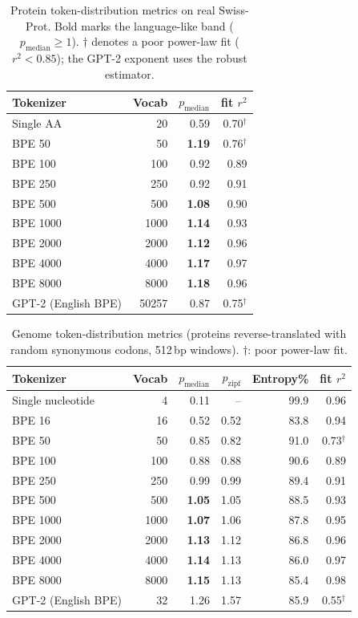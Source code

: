 \documentclass[11pt]{article}
\begin{document}
\begin{table}[t]
\centering
\caption{Protein token-distribution metrics on real Swiss-Prot. Bold marks the
language-like band ($p_{\text{median}}\!\geq\!1$). $\dagger$ denotes a poor
power-law fit ($r^2<0.85$); the GPT-2 exponent uses the robust estimator.}
\label{tab:protein}
\begin{tabular}{lrrr}
\toprule
Tokenizer & Vocab & $p_{\text{median}}$ & fit $r^2$ \\
\midrule
Single AA            & 20    & 0.59 & 0.70$^\dagger$ \\
BPE 50               & 50    & \textbf{1.19} & 0.76$^\dagger$ \\
BPE 100              & 100   & 0.92 & 0.89 \\
BPE 250              & 250   & 0.92 & 0.91 \\
BPE 500              & 500   & \textbf{1.08} & 0.90 \\
BPE 1000             & 1000  & \textbf{1.14} & 0.93 \\
BPE 2000             & 2000  & \textbf{1.12} & 0.96 \\
BPE 4000             & 4000  & \textbf{1.17} & 0.97 \\
BPE 8000             & 8000  & \textbf{1.18} & 0.96 \\
GPT-2 (English BPE)  & 50257 & 0.87 & 0.75$^\dagger$ \\
\bottomrule
\end{tabular}
\end{table}

\begin{table}[t]
\centering
\caption{Genome token-distribution metrics (proteins reverse-translated with
random synonymous codons, 512\,bp windows). $\dagger$: poor power-law fit.}
\label{tab:genome}
\begin{tabular}{lrrrrr}
\toprule
Tokenizer & Vocab & $p_{\text{median}}$ & $p_{\text{zipf}}$ & Entropy\% & fit $r^2$ \\
\midrule
Single nucleotide    & 4    & 0.11 & --   & 99.9 & 0.96 \\
BPE 16               & 16   & 0.52 & 0.52 & 83.8 & 0.94 \\
BPE 50               & 50   & 0.85 & 0.82 & 91.0 & 0.73$^\dagger$ \\
BPE 100              & 100  & 0.88 & 0.88 & 90.6 & 0.89 \\
BPE 250              & 250  & 0.99 & 0.99 & 89.4 & 0.91 \\
BPE 500              & 500  & \textbf{1.05} & 1.05 & 88.5 & 0.93 \\
BPE 1000             & 1000 & \textbf{1.07} & 1.06 & 87.8 & 0.95 \\
BPE 2000             & 2000 & \textbf{1.13} & 1.12 & 86.8 & 0.96 \\
BPE 4000             & 4000 & \textbf{1.14} & 1.13 & 86.0 & 0.97 \\
BPE 8000             & 8000 & \textbf{1.15} & 1.13 & 85.4 & 0.98 \\
GPT-2 (English BPE)  & 32   & 1.26 & 1.57 & 85.9 & 0.55$^\dagger$ \\
\bottomrule
\end{tabular}
\end{table}
\end{document}
